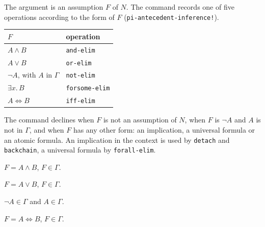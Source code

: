 The argument is an assumption $F$ of $N$.  The command records one of
five operations according to the form of $F$
(\texttt{pi-antecedent-inference!}).
\begin{center}
\begin{tabular}{@{}ll@{}}
\toprule
$F$ & operation \\
\midrule
$A \wedge B$ & \texttt{and-elim} \\
$A \vee B$ & \texttt{or-elim} \\
$\neg A$, with $A$ in $\Gamma$ & \texttt{not-elim} \\
$\exists x.\, B$ & \texttt{forsome-elim} \\
$A \Leftrightarrow B$ & \texttt{iff-elim} \\
\bottomrule
\end{tabular}
\end{center}
The command declines when $F$ is not an assumption of $N$, when $F$ is
$\neg A$ and $A$ is not in $\Gamma$, and when $F$ has any other form: an
implication, a universal formula or an atomic formula.  An implication in
the context is used by \texttt{detach} and \texttt{backchain}, a universal
formula by \texttt{forall-elim}.

\label{kop:and-elim}%
\begin{VNBcond}
\item[Assumption] $F = A \wedge B$, $F \in \Gamma$.
\end{VNBcond}
\label{kop:or-elim}%
\begin{VNBcond}
\item[Assumption] $F = A \vee B$, $F \in \Gamma$.
\end{VNBcond}
\label{kop:not-elim}%
\begin{VNBcond}
\item[Assumption] $\neg A \in \Gamma$ and $A \in \Gamma$.
\end{VNBcond}
\label{kop:iff-elim}%
\begin{VNBcond}
\item[Assumption] $F = A \Leftrightarrow B$, $F \in \Gamma$.
\end{VNBcond}


